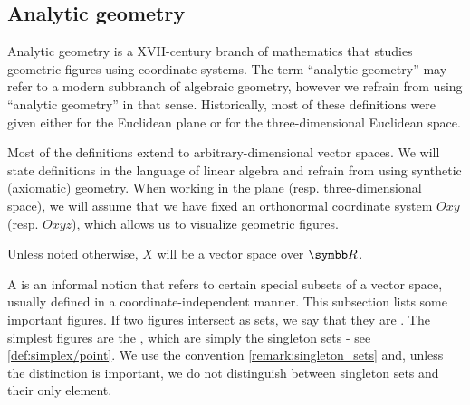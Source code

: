 \subsection{Analytic geometry}\label{subsec:analytic_geometry}

\begin{remark}\label{remark:analytic_geometry}
  Analytic geometry is a XVII-century branch of mathematics that studies geometric figures using coordinate systems. The term \enquote{analytic geometry} may refer to a modern subbranch of algebraic geometry, however we refrain from using \enquote{analytic geometry} in that sense. Historically, most of these definitions were given either for the Euclidean plane or for the three-dimensional Euclidean space.

  Most of the definitions extend to arbitrary-dimensional vector spaces. We will state definitions in the language of linear algebra and refrain from using synthetic (axiomatic) geometry. When working in the plane (resp. three-dimensional space), we will assume that we have fixed an orthonormal coordinate system \( Oxy \) (resp. \( Oxyz \)), which allows us to visualize geometric figures.
\end{remark}

Unless noted otherwise, \( X \) will be a vector space over \( \R \).

\begin{definition}\label{def:geometric_figure}
  A  is an informal notion that refers to certain special subsets of a vector space, usually defined in a coordinate-independent manner. This subsection lists some important figures. If two figures intersect as sets, we say that they are . The simplest figures are the , which are simply the singleton sets - see \cref{def:simplex/point}. We use the convention \cref{remark:singleton_sets} and, unless the distinction is important, we do not distinguish between singleton sets and their only element.
\end{definition}

